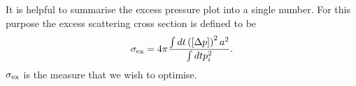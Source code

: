 %
%




It is helpful to summarise the excess pressure plot into a single number.
For this purpose the excess scattering cross section is defined to be
\begin{align}
   \sigma_\textrm{ex} = 4\pi \frac{ \int dt\left(  \left[ \Delta p \right] \right)^2 a^2 }{\int dt p_i^2}. \label{eqn:excessI}
\end{align}
$\sigma_\textrm{ex}$ is the  measure that we wish to optimise.






